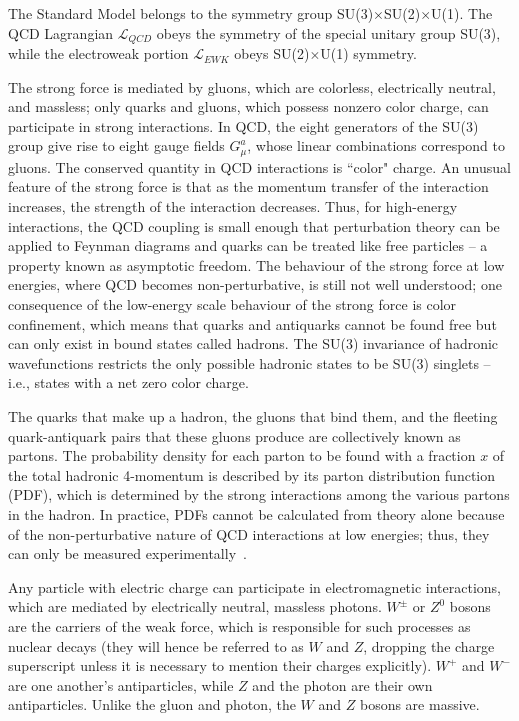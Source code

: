 The Standard Model belongs to the symmetry group SU(3)$\times$SU(2)$\times$U(1). The QCD Lagrangian $\mathcal{L}_{QCD}$ obeys the symmetry of the special unitary group SU(3), while the electroweak portion $\mathcal{L}_{EWK}$ obeys SU(2)$\times$U(1) symmetry.

The strong force is mediated by gluons, which are colorless, electrically neutral, and massless; only quarks and gluons, which possess nonzero color charge, can participate in strong interactions. In QCD, the eight generators of the SU(3) group give rise to eight gauge fields $G^{a}_{\mu}$, whose linear combinations correspond to gluons. The conserved quantity in QCD interactions is ``color" charge. An unusual feature of the strong force is that as the momentum transfer of the interaction increases, the strength of the interaction decreases. Thus, for high-energy interactions, the QCD coupling is small enough that perturbation theory can be applied to Feynman diagrams and quarks can be treated like free particles -- a property known as asymptotic freedom. The behaviour of the strong force at low energies, where QCD becomes non-perturbative, is still not well understood; one consequence of the low-energy scale behaviour of the strong force is color confinement, which means that quarks and antiquarks cannot be found free but can only exist in bound states called hadrons. The SU(3) invariance of hadronic wavefunctions restricts the only possible hadronic states to be SU(3) singlets -- i.e., states with a net zero color charge.

The quarks that make up a hadron, the gluons that bind them, and the fleeting quark-antiquark pairs that these gluons produce are collectively known as partons. The probability density for each parton to be found with a fraction $x$ of the total hadronic 4-momentum is described by its parton distribution function (PDF), which is determined by the strong interactions among the various partons in the hadron. In practice, PDFs cannot be calculated from theory alone because of the non-perturbative nature of QCD interactions at low energies; thus, they can only be measured experimentally~\cite{BettiniPhysics}.

Any particle with electric charge can participate in electromagnetic interactions, which are mediated by electrically neutral, massless photons. $W^{\pm}$ or $Z^{0}$ bosons are the carriers of the weak force, which is responsible for such processes as nuclear decays (they will hence be referred to as $W$ and $Z$, dropping the charge superscript unless it is necessary to mention their charges explicitly). $W^{+}$ and $W^{-}$ are one another's antiparticles, while $Z$ and the photon are their own antiparticles. Unlike the gluon and photon, the $W$ and $Z$ bosons are massive.
 

